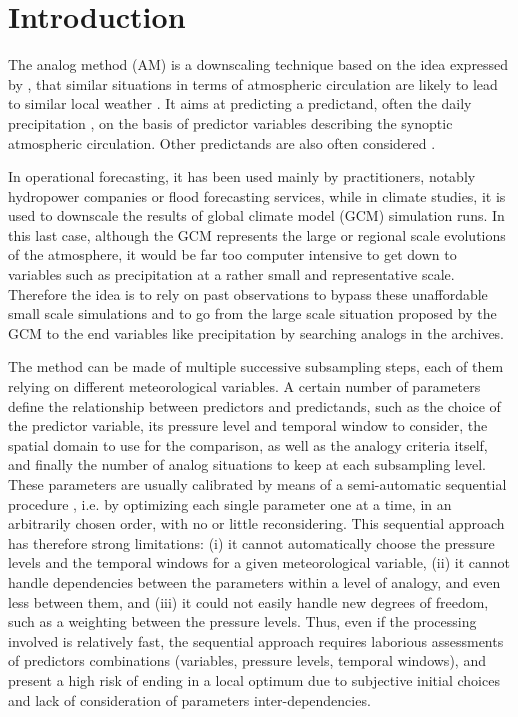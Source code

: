 \documentclass[review]{elsarticle}
\begin{document}
\linenumbers

\section{Introduction}
\label{sec:intro}

The analog method (AM) is a downscaling technique based on the idea expressed by \citet{Lorenz1956, Lorenz1969}, that similar situations in terms of atmospheric circulation are likely to lead to similar local weather \citep{Duband1970, Bontron2005}. It aims at predicting a predictand, often the daily precipitation \citep[eg.][]{Guilbaud1997, Bontron2005, Bliefernicht2010, Marty2012, Horton2012, Radanovics2013, BenDaoud2015}, on the basis of predictor variables describing the synoptic atmospheric circulation. Other predictands are also often considered \citep[see][for a non-exhaustive list]{Horton2016}.

In operational forecasting, it has been used mainly by practitioners, notably hydropower companies or flood forecasting services, while in climate studies, it is used to downscale the results of global climate model (GCM) simulation runs. In this last case, although the GCM represents the large or regional scale evolutions of the atmosphere, it would be far too computer intensive to get down to variables such as precipitation at a rather small and representative scale. Therefore the idea is to rely on past observations to bypass these unaffordable small scale simulations and to go from the large scale situation proposed by the GCM to the end variables like precipitation by searching analogs in the archives. 

The method can be made of multiple successive subsampling steps, each of them relying on different meteorological variables. A certain number of parameters define the relationship between predictors and predictands, such as the choice of the predictor variable, its pressure level and temporal window to consider, the spatial domain to use for the comparison, as well as the analogy criteria itself, and finally the number of analog situations to keep at each subsampling level. These parameters are usually calibrated by means of a semi-automatic sequential procedure \citep[see][for the details]{Bontron2004, Horton2016}, i.e. by optimizing each single parameter one at a time, in an arbitrarily chosen order, with no or little reconsidering. This sequential approach has therefore strong limitations: (i) it cannot automatically choose the pressure levels and the temporal windows for a given meteorological variable, (ii) it cannot handle dependencies between the parameters within a level of analogy, and even less between them, and (iii) it could not easily handle new degrees of freedom, such as a weighting between the pressure levels. Thus, even if the processing involved is relatively fast, the sequential approach requires laborious assessments of predictors combinations (variables, pressure levels, temporal windows), and present a high risk of ending in a local optimum due to subjective initial choices and lack of consideration of parameters inter-dependencies.
\end{document}
